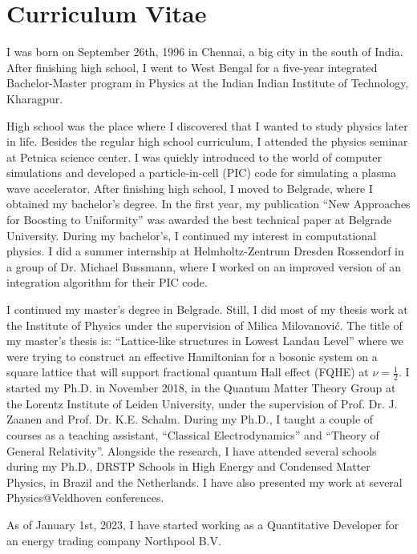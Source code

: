 \newpage
\thispagestyle{empty}

\chapter*{Curriculum Vitae} %
\label{Curriculum Vitae}

I was born on September 26th, 1996 in Chennai, a big city in the south of India. After finishing high school, I went to West Bengal for a five-year integrated Bachelor-Master program in Physics at the Indian Indian Institute of Technology, Kharagpur.
\par
High school was the place where I discovered that I wanted to study physics later in life. Besides the regular high school curriculum, I attended the physics seminar at Petnica science center. I was quickly introduced to the world of computer simulations and developed a particle-in-cell (PIC) code for simulating a plasma wave accelerator. After finishing high school, I moved to Belgrade, where I obtained my bachelor's degree. In the first year, my publication ``New Approaches for Boosting to Uniformity'' was awarded the best technical paper at Belgrade University. During my bachelor's, I continued my interest in computational physics. I did a summer internship at Helmholtz-Zentrum Dresden Rossendorf in a group of Dr. Michael Bussmann, where I worked on an improved version of an integration algorithm for their PIC code. 
\par
I continued my master's degree in Belgrade. Still, I did most of my thesis work at the Institute of Physics under the supervision of Milica Milovanović. The title of my master's thesis is: ``Lattice-like structures in Lowest Landau Level'' where we were trying to construct an effective Hamiltonian for a bosonic system on a square lattice that will support fractional quantum Hall effect (FQHE) at $\nu=\frac{1}{2}$. I started my Ph.D. in November 2018, in the Quantum Matter Theory Group at the Lorentz Institute of Leiden University, under the supervision of Prof. Dr. J. Zaanen and Prof. Dr. K.E. Schalm. During my Ph.D., I taught a couple of courses as a teaching assistant, ``Classical Electrodynamics'' and ``Theory of General Relativity''. Alongside the research, I have attended several schools during my Ph.D., DRSTP Schools in High Energy and Condensed Matter Physics, in Brazil and the Netherlands. I have also presented my work at several Physics@Veldhoven conferences.

As of January 1st, 2023, I have started working as a Quantitative Developer for an energy trading company Northpool B.V.


\newpage
\thispagestyle{empty}
